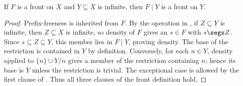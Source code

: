 \begin{lemma}
If $F$ is a front on $X$ and $Y\subseteq X$ is infinite, then
$F\mathbin{|}Y$ is a front on $Y$.
\end{lemma}
\begin{proof}
Prefix-freeness is inherited from $F$.  By the operation in
, if $Z\subseteq Y$ is infinite,
then $Z\subseteq X$ is infinite, so density of $F$ gives an $s\in F$ with
$s\segs Z$.  Since $s\subseteq Z\subseteq Y$, this member lies in
$F\mathbin{|}Y$, proving density.  The base of the restriction is contained
in $Y$ by definition.  Conversely, for each $n\in Y$, density applied to
$\{n\}\cup Y/n$ gives a member of the restriction containing $n$; hence its
base is $Y$ unless the restriction is trivial.  The exceptional case is
allowed by the first clause of .  Thus all three clauses of
the front definition hold.
\end{proof}
